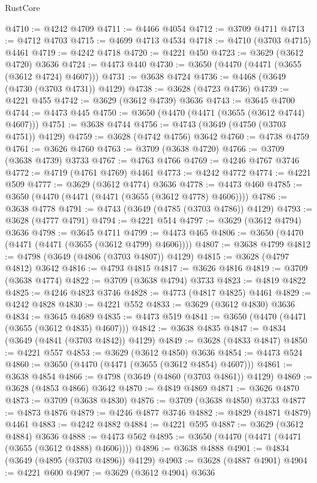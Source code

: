 \begin{lexlean}{RustCore}
\begin{coremodule}
@4710 := @4242 @4709
@4711 := @4466 @4054
@4712 := @3709 @4711
@4713 := @4712 @4703
@4715 := @4699 @4713 @4534
@4718 := @4710 (@3703 @4715) @4461
@4719 := @4242 @4718
@4720 := @4221 @450
@4723 := @3629 (@3612 @4720) @3636
@4724 := @4473 @440
@4730 := @3650 (@4470 (@4471 (@3655 (@3612 @4724) @4607)))
@4731 := @3638 @4724
@4736 := @4468 (@3649 (@4730 (@3703 @4731)) @4129)
@4738 := @3628 (@4723 @4736)
@4739 := @4221 @455
@4742 := @3629 (@3612 @4739) @3636
@4743 := @3645 @4700
@4744 := @4473 @445
@4750 := @3650 (@4470 (@4471 (@3655 (@3612 @4744) @4607)))
@4751 := @3638 @4744
@4756 := @4743 (@3649 (@4750 (@3703 @4751)) @4129)
@4759 := @3628 (@4742 @4756) @3642
@4760 := @4738 @4759
@4761 := @3626 @4760
@4763 := @3709 (@3638 @4720)
@4766 := @3709 (@3638 @4739) @3733
@4767 := @4763 @4766
@4769 := @4246 @4767 @3746
@4772 := @4719 (@4761 @4769) @4461
@4773 := @4242 @4772
@4774 := @4221 @509
@4777 := @3629 (@3612 @4774) @3636
@4778 := @4473 @460
@4785 := @3650 (@4470 (@4471 (@4471 (@3655 (@3612 @4778) @4606))))
@4786 := @3638 @4778
@4791 := @4743 (@3649 (@4785 (@3703 @4786)) @4129)
@4793 := @3628 (@4777 @4791)
@4794 := @4221 @514
@4797 := @3629 (@3612 @4794) @3636
@4798 := @3645 @4711
@4799 := @4473 @465
@4806 := @3650 (@4470 (@4471 (@4471 (@3655 (@3612 @4799) @4606))))
@4807 := @3638 @4799
@4812 := @4798 (@3649 (@4806 (@3703 @4807)) @4129)
@4815 := @3628 (@4797 @4812) @3642
@4816 := @4793 @4815
@4817 := @3626 @4816
@4819 := @3709 (@3638 @4774)
@4822 := @3709 (@3638 @4794) @3733
@4823 := @4819 @4822
@4825 := @4246 @4823 @3746
@4828 := @4773 (@4817 @4825) @4461
@4829 := @4242 @4828
@4830 := @4221 @552
@4833 := @3629 (@3612 @4830) @3636
@4834 := @3645 @4689
@4835 := @4473 @519
@4841 := @3650 (@4470 (@4471 (@3655 (@3612 @4835) @4607)))
@4842 := @3638 @4835
@4847 := @4834 (@3649 (@4841 (@3703 @4842)) @4129)
@4849 := @3628 (@4833 @4847)
@4850 := @4221 @557
@4853 := @3629 (@3612 @4850) @3636
@4854 := @4473 @524
@4860 := @3650 (@4470 (@4471 (@3655 (@3612 @4854) @4607)))
@4861 := @3638 @4854
@4866 := @4798 (@3649 (@4860 (@3703 @4861)) @4129)
@4869 := @3628 (@4853 @4866) @3642
@4870 := @4849 @4869
@4871 := @3626 @4870
@4873 := @3709 (@3638 @4830)
@4876 := @3709 (@3638 @4850) @3733
@4877 := @4873 @4876
@4879 := @4246 @4877 @3746
@4882 := @4829 (@4871 @4879) @4461
@4883 := @4242 @4882
@4884 := @4221 @595
@4887 := @3629 (@3612 @4884) @3636
@4888 := @4473 @562
@4895 := @3650 (@4470 (@4471 (@4471 (@3655 (@3612 @4888) @4606))))
@4896 := @3638 @4888
@4901 := @4834 (@3649 (@4895 (@3703 @4896)) @4129)
@4903 := @3628 (@4887 @4901)
@4904 := @4221 @600
@4907 := @3629 (@3612 @4904) @3636

\end{coremodule}
\end{lexlean}
